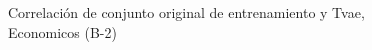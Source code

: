 \begin{figure}[H]
    \centering
    
    \caption{Correlación de conjunto original de entrenamiento y Tvae, Economicos (B-2)}
    \label{pairwise-economicos-b-2-tvae}
\end{figure}